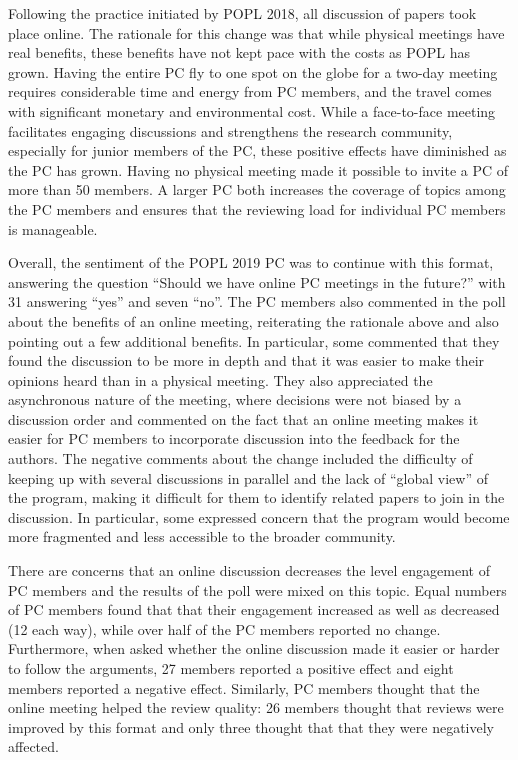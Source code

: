 Following the practice initiated by POPL 2018, all discussion of papers took
place online. The rationale for this change was that while physical meetings
have real benefits, these benefits have not kept pace with the costs as POPL
has grown.  Having the entire PC fly to one spot on the globe for a two-day
meeting requires considerable time and energy from PC members, and the travel
comes with significant monetary and environmental cost.  While a face-to-face
meeting facilitates engaging discussions and strengthens the research
community, especially for junior members of the PC, these positive effects
have diminished as the PC has grown. Having no physical meeting made it
possible to invite a PC of more than 50 members. A larger PC both increases
the coverage of topics among the PC members and ensures that the reviewing
load for individual PC members is manageable.

Overall, the sentiment of the POPL 2019 PC was to continue with this format,
answering the question ``Should we have online PC meetings in the future?''
with 31 answering ``yes'' and seven ``no''.  The PC members also commented in
the poll about the benefits of an online meeting, reiterating the rationale
above and also pointing out a few additional benefits. In particular, some
commented that they found the discussion to be more in depth and that it was
easier to make their opinions heard than in a physical meeting. They also
appreciated the asynchronous nature of the meeting, where decisions were not
biased by a discussion order and commented on the fact that an online meeting
makes it easier for PC members to incorporate discussion into the
feedback for the authors.  The negative comments about the change included the
difficulty of keeping up with several discussions in parallel and the lack of
``global view'' of the program, making it difficult for them to identify
related papers to join in the discussion. In particular, some expressed
concern that the program would become more fragmented and less accessible to
the broader community.

There are concerns that an online discussion decreases the level engagement of
PC members and the results of the poll were mixed on this topic. Equal numbers
of PC members found that that their engagement increased as well as decreased
(12 each way), while over half of the PC members reported no
change. Furthermore, when asked whether the online discussion made it easier
or harder to follow the arguments, 27 members reported a positive effect and
eight members reported a negative effect.  Similarly, PC members thought that
the online meeting helped the review quality: 26 members thought that reviews
were improved by this format and only three thought that that they were
negatively affected.

